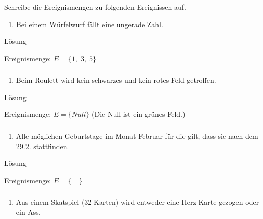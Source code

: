 \documentclass[
  ngerman,
]{book}
\providecommand{\tightlist}{%
  \setlength{\itemsep}{0pt}\setlength{\parskip}{0pt}}
\begin{document}
Schreibe die Ereignismengen zu folgenden Ereignissen auf.

\begin{enumerate}
\def\labelenumi{\alph{enumi})}
\tightlist
\item
  Bei einem Würfelwurf fällt eine ungerade Zahl.
\end{enumerate}

Lösung

Ereignismenge: \(E=\{1,\;3,\;5\}\)

\hypertarget{section-56}{%
\subsubsection*{}\label{section-56}}

\begin{enumerate}
\def\labelenumi{\alph{enumi})}
\setcounter{enumi}{1}
\tightlist
\item
  Beim Roulett wird kein schwarzes und kein rotes Feld getroffen.
\end{enumerate}

Lösung

Ereignismenge: \(E=\{Null\}\) (Die Null ist ein grünes Feld.)

\hypertarget{section-57}{%
\subsubsection*{}\label{section-57}}

\begin{enumerate}
\def\labelenumi{\alph{enumi})}
\setcounter{enumi}{2}
\tightlist
\item
  Alle möglichen Geburtstage im Monat Februar für die gilt, dass sie nach dem 29.2. stattfinden.
\end{enumerate}

Lösung

Ereignismenge: \(E=\{\quad\}\)

\hypertarget{section-58}{%
\subsubsection*{}\label{section-58}}

\begin{enumerate}
\def\labelenumi{\alph{enumi})}
\setcounter{enumi}{3}
\tightlist
\item
  Aus einem Skatspiel (32 Karten) wird entweder eine Herz-Karte gezogen oder ein Ass.
\end{enumerate}
\end{document}
